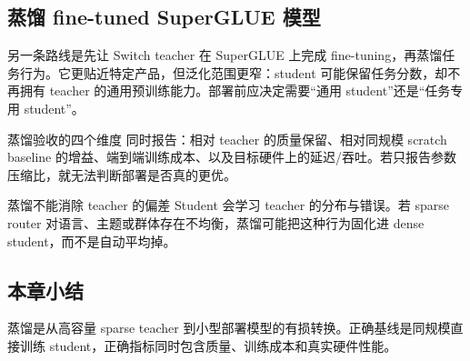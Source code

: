 
\subsection{蒸馏 fine-tuned SuperGLUE 模型}

另一条路线是先让 Switch teacher 在 SuperGLUE 上完成 fine-tuning，再蒸馏任务行为。它更贴近特定产品，但泛化范围更窄：student 可能保留任务分数，却不再拥有 teacher 的通用预训练能力。部署前应决定需要“通用 student”还是“任务专用 student”。


\begin{importantbox}{蒸馏验收的四个维度}
同时报告：相对 teacher 的质量保留、相对同规模 scratch baseline 的增益、端到端训练成本、以及目标硬件上的延迟/吞吐。若只报告参数压缩比，就无法判断部署是否真的更优。
\end{importantbox}

\begin{warningbox}{蒸馏不能消除 teacher 的偏差}
Student 会学习 teacher 的分布与错误。若 sparse router 对语言、主题或群体存在不均衡，蒸馏可能把这种行为固化进 dense student，而不是自动平均掉。
\end{warningbox}

\subsection{本章小结}

蒸馏是从高容量 sparse teacher 到小型部署模型的有损转换。正确基线是同规模直接训练 student，正确指标同时包含质量、训练成本和真实硬件性能。

